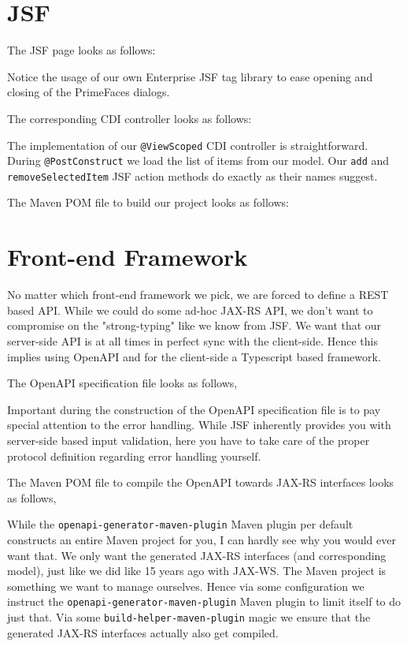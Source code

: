 \section{JSF}
The JSF page looks as follows:

Notice the usage of our own Enterprise JSF tag library to ease opening and closing of the PrimeFaces dialogs.

The corresponding CDI controller looks as follows:

The implementation of our \texttt{@ViewScoped} CDI controller is straightforward.
During \texttt{@PostConstruct} we load the list of items from our model.
Our \texttt{add} and \texttt{removeSelected\allowbreak Item} JSF action methods do exactly as their names suggest.

The Maven POM file to build our project looks as follows:


\section{Front-end Framework}
No matter which front-end framework we pick, we are forced to define a REST based API.
While we could do some ad-hoc JAX-RS API, we don't want to compromise on the "strong-typing" like we know from JSF.
We want that our server-side API is at all times in perfect sync with the client-side.
Hence this implies using OpenAPI \cite{openapi} and for the client-side a Typescript based framework.

The OpenAPI specification file looks as follows,

Important during the construction of the OpenAPI specification file is to pay special attention to the error handling.
While JSF inherently provides you with server-side based input validation, here you have to take care of the proper protocol definition regarding error handling yourself.

The Maven POM file to compile the OpenAPI towards JAX-RS interfaces looks as follows,

While the \texttt{openapi-generator-maven-plugin} Maven plugin per default constructs an entire Maven project for you, I can hardly see why you would ever want that.
We only want the generated JAX-RS interfaces (and corresponding model), just like we did like 15 years ago with JAX-WS.
The Maven project is something we want to manage ourselves.
Hence via some configuration we instruct the \texttt{openapi-generator-maven-plugin} Maven plugin to limit itself to do just that.
Via some \texttt{build-helper-\allowbreak maven-plugin} magic we ensure that the generated JAX-RS interfaces actually also get compiled.

